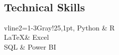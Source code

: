\documentclass[a3paper,11pt]{article}
\begin{document}
\begin{adjustbox}{valign=t}
\begin{minipage}{0.6\textwidth}
\begin{description}
	\\
	
\end{description}

\MySkip
\begin{multicols}{2}
\section*{Technical Skills}
\begin{tblr}{
vline{2}={1-3}{Gray!25,1pt},
}
	Python & R \\
	\LaTeX & Excel \\
	SQL	& Power BI \\
\end{tblr}

\vfill\null \columnbreak  %


\end{multicols}
\end{minipage}
\end{adjustbox}
\end{document}
